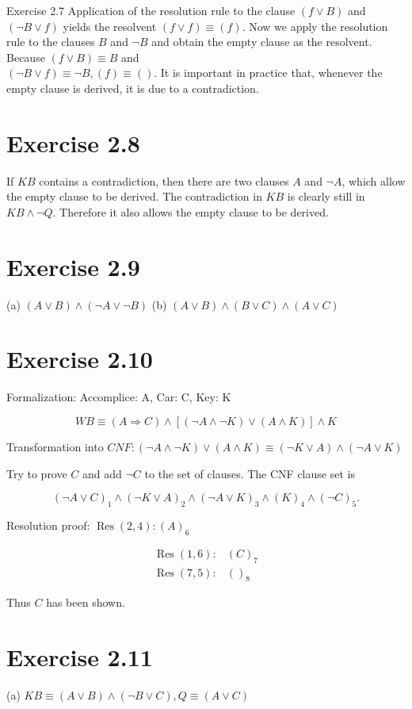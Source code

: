 \documentclass[10pt]{book}
\begin{document}
Exercise 2.7 Application of the resolution rule to the clause $(f \vee B)$ and $(\neg B \vee f)$ yields the resolvent $(f \vee f) \equiv (f)$. Now we apply the resolution rule to the clauses $B$ and $\neg B$ and obtain the empty clause as the resolvent. Because $(f \vee B) \equiv B$ and\\
$(\neg B \vee f) \equiv \neg B,(f) \equiv()$. It is important in practice that, whenever the empty clause is derived, it is due to a contradiction.
\section{Exercise 2.8}
If $K B$ contains a contradiction, then there are two clauses $A$ and $\neg A$, which allow the empty clause to be derived. The contradiction in $K B$ is clearly still in $K B \wedge \neg Q$. Therefore it also allows the empty clause to be derived.

\section{Exercise 2.9}
(a) $(A \vee B) \wedge(\neg A \vee \neg B)$ (b) $(A \vee B) \wedge(B \vee C) \wedge(A \vee C)$

\section{Exercise 2.10}
Formalization: Accomplice: A, Car: C, Key: K

$$
W B \equiv(A \Rightarrow C) \wedge[(\neg A \wedge \neg K) \vee(A \wedge K)] \wedge K
$$

Transformation into $C N F:(\neg A \wedge \neg K) \vee(A \wedge K) \equiv(\neg K \vee A) \wedge(\neg A \vee K)$

Try to prove $C$ and add $\neg C$ to the set of clauses. The CNF clause set is

$$
(\neg A \vee C)_{1} \wedge(\neg K \vee A)_{2} \wedge(\neg A \vee K)_{3} \wedge(K)_{4} \wedge(\neg C)_{5} .
$$

Resolution proof: $\operatorname{Res}(2,4):(A)_{6}$

$$
\begin{array}{ll}
\operatorname{Res}(1,6): & (C)_{7} \\
\operatorname{Res}(7,5): & ()_{8}
\end{array}
$$

Thus $C$ has been shown.

\section{Exercise 2.11}
(a) $K B \equiv(A \vee B) \wedge(\neg B \vee C), Q \equiv(A \vee C)$
\end{document}
